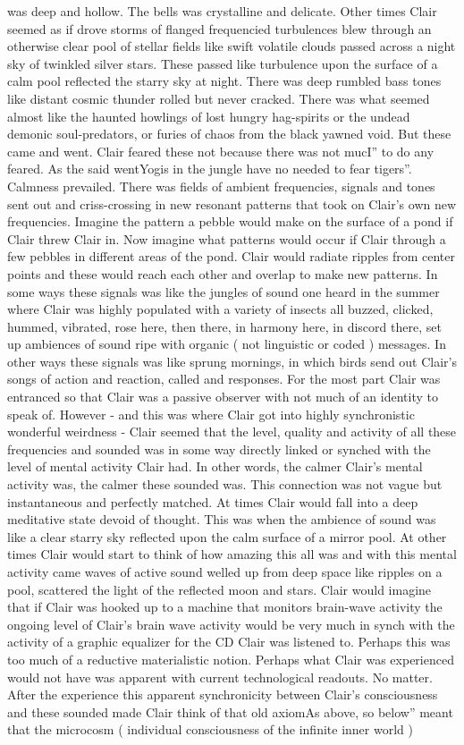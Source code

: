 \documentclass[12pt]{book}
\begin{document}
was deep and hollow. The bells was crystalline and delicate. Other times Clair seemed as if drove storms of flanged frequencied turbulences blew through an otherwise clear pool of stellar fields like swift volatile clouds passed across a night sky of twinkled silver stars. These passed like turbulence upon the surface of a calm pool reflected the starry sky at night. There was deep rumbled bass tones like distant cosmic thunder rolled but never cracked. There was what seemed almost like the haunted howlings of lost hungry hag-spirits or the undead demonic soul-predators, or furies of chaos from the black yawned void. But these came and went. Clair feared these not because there was not mucI'' to do any feared. As the said wentYogis in the jungle have no needed to fear tigers''. Calmness prevailed. There was fields of ambient frequencies, signals and tones sent out and criss-crossing in new resonant patterns that took on Clair's own new frequencies. Imagine the pattern a pebble would make on the surface of a pond if Clair threw Clair in. Now imagine what patterns would occur if Clair through a few pebbles in different areas of the pond. Clair would radiate ripples from center points and these would reach each other and overlap to make new patterns. In some ways these signals was like the jungles of sound one heard in the summer where Clair was highly populated with a variety of insects all buzzed, clicked, hummed, vibrated, rose here, then there, in harmony here, in discord there, set up ambiences of sound ripe with organic ( not linguistic or coded ) messages. In other ways these signals was like sprung mornings, in which birds send out Clair's songs of action and reaction, called and responses. For the most part Clair was entranced so that Clair was a passive observer with not much of an identity to speak of. However - and this was where Clair got into highly synchronistic wonderful weirdness - Clair seemed that the level, quality and activity of all these frequencies and sounded was in some way directly linked or synched with the level of mental activity Clair had. In other words, the calmer Clair's mental activity was, the calmer these sounded was. This connection was not vague but instantaneous and perfectly matched. At times Clair would fall into a deep meditative state devoid of thought. This was when the ambience of sound was like a clear starry sky reflected upon the calm surface of a mirror pool. At other times Clair would start to think of how amazing this all was and with this mental activity came waves of active sound welled up from deep space like ripples on a pool, scattered the light of the reflected moon and stars. Clair would imagine that if Clair was hooked up to a machine that monitors brain-wave activity the ongoing level of Clair's brain wave activity would be very much in synch with the activity of a graphic equalizer for the CD Clair was listened to. Perhaps this was too much of a reductive materialistic notion. Perhaps what Clair was experienced would not have was apparent with current technological readouts. No matter. After the experience this apparent synchronicity between Clair's consciousness and these sounded made Clair think of that old axiomAs above, so below'' meant that the microcosm ( individual consciousness of the infinite inner world ) 
\end{document}
